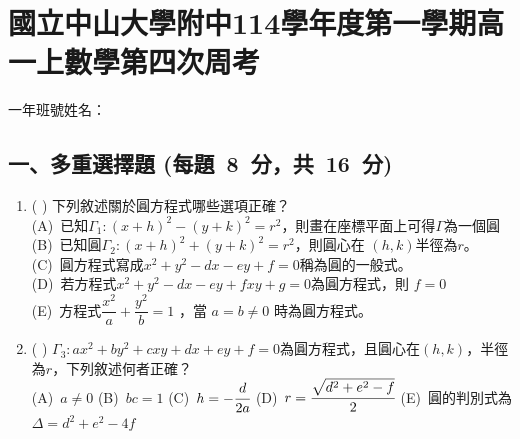 \documentclass[b4paper,12pt]{exam}
\newcommand{\anslabel}[1]{%
  \makebox[3em][c]{%
    \ifshowAnswer{\color{red}#1}\else\phantom{#1}\fi
  }%
}
\newcommand\testTitle[1]{\section*{#1}}
\newcommand\testSubsection[4]{\subsection*{#1 (每#2\ #3\ 分，共\ #4\ 分)}}
\newif\ifshowAnswer
\begin{document}

{\centering
\testTitle{國立中山大學附中114學年度第一學期高一上數學第四次周考}
}

\hfill 一年\hspace{2em}班\hspace{2em}號\quad 姓名：\hspace{6em}\quad\\
\vspace{0.5em}


\testSubsection{一、多重選擇題}{題}{8}{16}
\begin{enumerate}[itemsep=0.5em, topsep=1em,
                  label=\arabic*.]
    \item(\anslabel{CDE}) 下列敘述關於圓方程式哪些選項正確？\\[.5em]
        (A)~{已知$\Gamma_1:(x+h)^2-(y+k)^2=r^2$，則畫在座標平面上可得$\Gamma$為一個圓}\\[.5em]
        (B)~{已知圓$\Gamma_2:(x+h)^2+(y+k)^2=r^2$，則圓心在 $(h,k)$半徑為$r$。}\\[.5em]
        (C)~{圓方程式寫成$x^2+y^2-dx-ey+f=0$稱為圓的一般式。}\\[.5em]
        (D)~{若方程式$x^2+y^2-dx-ey+fxy+g=0$為圓方程式，則 $f=0$}\\[.5em]
        (E)~{方程式$\dfrac{x^2}{a}+\dfrac{y^2}{b}=1$ ，當 $a=b\neq0$ 時為圓方程式。}

    \item(\anslabel{ACE}) $\Gamma_3:ax^2+by^2+cxy+dx+ey+f=0$為圓方程式，且圓心在$(h,k)$，半徑為$r$，下列敘述何者正確？\\[.5em]
        (A)~{$a\neq0$}\hspace{2em}
        (B)~{$bc=1$}\hspace{2em}
        (C)~{$h=-\cfrac{d}{2a}$}\hspace{2em}
        (D)~{$r=\cfrac{\sqrt{d^2+e^2-f}}{2}$}\hspace{2em}
        (E)~{圓的判別式為 $\Delta=d^2+e^2-4f$}\\
\end{enumerate}

\end{document}
